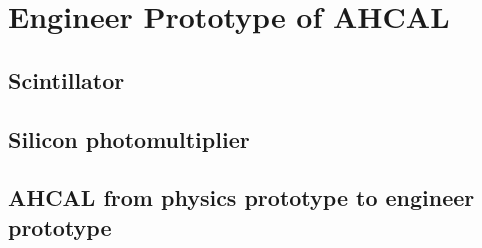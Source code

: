 \chapter{Engineer Prototype of AHCAL}

\section{Scintillator}

\section{Silicon photomultiplier}

\section{AHCAL from physics prototype to engineer prototype}

